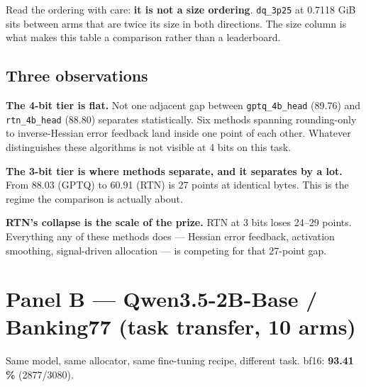 \documentclass[11pt]{article}
\newcommand{\pct}{\,\%}
\newcommand{\code}[1]{\texttt{#1}}
\begin{document}
Read the ordering with care: \textbf{it is not a size ordering}. \code{dq\_3p25} at 0.7118 GiB
sits between arms that are twice its size in both directions. The size column is what makes this
table a comparison rather than a leaderboard.

\subsection*{Three observations}

\textbf{The 4-bit tier is flat.} Not one adjacent gap between \code{gptq\_4b\_head} (89.76) and
\code{rtn\_4b\_head} (88.80) separates statistically. Six methods spanning rounding-only to
inverse-Hessian error feedback land inside one point of each other. Whatever distinguishes these
algorithms is not visible at 4 bits on this task.

\textbf{The 3-bit tier is where methods separate, and it separates by a lot.} From 88.03 (GPTQ)
to 60.91 (RTN) is 27 points at identical bytes. This is the regime the comparison is actually
about.

\textbf{RTN's collapse is the scale of the prize.} RTN at 3 bits loses 24--29 points. Everything
any of these methods does --- Hessian error feedback, activation smoothing, signal-driven
allocation --- is competing for that 27-point gap.

\section{Panel B --- Qwen3.5-2B-Base / Banking77 (task transfer, 10 arms)}

Same model, same allocator, same fine-tuning recipe, different task. bf16: \textbf{93.41\pct}
(2877/3080).
\end{document}
